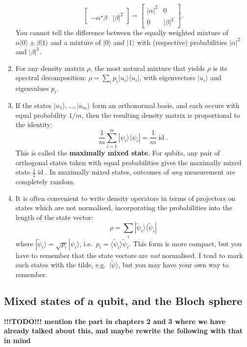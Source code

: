 \documentclass{article}
\begin{document}
\begin{enumerate}
\[\begin{bmatrix}
     \\-\alpha^\star\beta & |\beta|^2
     \end{bmatrix}
     =
     \begin{bmatrix}
       |\alpha|^2 & 0
     \\0 & |\beta|^2
     \end{bmatrix}.
   \]
  You cannot tell the difference between the equally weighted mixture of \(\alpha|0\rangle\pm\beta|1\rangle\) and a mixture of \(|0\rangle\) and \(|1\rangle\) with (respective) probabilities \(|\alpha|^2\) and \(|\beta|^2\).
\item
  For any density matrix \(\rho\), the most natural mixture that yields \(\rho\) is its spectral decomposition: \(\rho=\sum_i p_i|u_i\rangle\langle u_i|\), with eigenvectors \(|u_i\rangle\) and eigenvalues \(p_i\).
\item
  If the states \(|u_1\rangle,\ldots,|u_m\rangle\) form an orthonormal basis, and each occurs with equal probability \(1/m\), then the resulting density matrix is proportional to the identity:
  \[
     \frac{1}{m}\sum_{i=1}^m |\psi_i\rangle\langle\psi_i|
     = \frac{1}{m}\operatorname{id}.
   \]
  This is called the \textbf{maximally mixed state}.
  For qubits, any pair of orthogonal states taken with equal probabilities gives the maximally mixed state \(\frac12\operatorname{id}\).
  In maximally mixed states, outcomes of \emph{any} measurement are completely random.
\item
  It is often convenient to write density operators in terms of projectors on states which are not normalised, incorporating the probabilities into the length of the state vector:
  \[
     \rho = \sum_i|\widetilde\psi_i\rangle\langle\widetilde\psi_i|
   \]
  where \(|\widetilde\psi_i\rangle = \sqrt{p_i}|\psi_i\rangle\), i.e.~\(p_i=\langle\widetilde\psi_i\rangle{\widetilde\psi_i}\).
  This form is more compact, but you have to remember that the state vectors are \emph{not} normalised.
  I tend to mark such states with the tilde, e.g.~\(|\widetilde\psi\rangle\), but you may have your own way to remember.
\end{enumerate}

\hypertarget{mixed-states-of-a-qubit-and-the-bloch-sphere}{%
\subsection{Mixed states of a qubit, and the Bloch sphere}\label{mixed-states-of-a-qubit-and-the-bloch-sphere}}

\textbf{!!!TODO!!! mention the part in chapters 2 and 3 where we have already talked about this, and maybe rewrite the following with that in mind}
\end{document}
